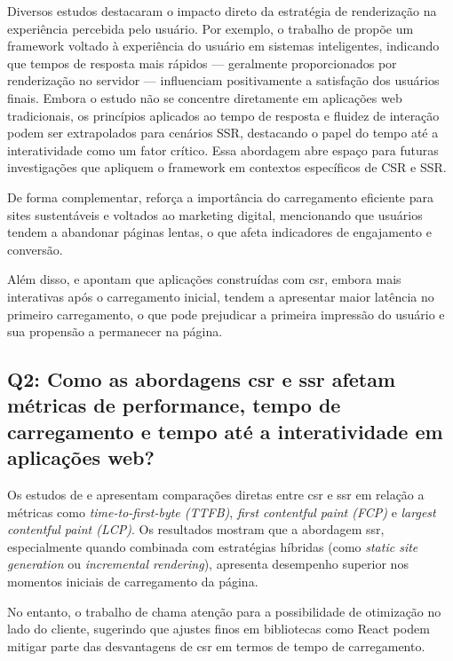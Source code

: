 Diversos estudos destacaram o impacto direto da estratégia de renderização na experiência percebida pelo usuário. Por exemplo, o trabalho de \cite{Zhou2022} propõe um framework voltado à experiência do usuário em sistemas inteligentes, indicando que tempos de resposta mais rápidos — geralmente proporcionados por renderização no servidor — influenciam positivamente a satisfação dos usuários finais. Embora o estudo não se concentre diretamente em aplicações web tradicionais, os princípios aplicados ao tempo de resposta e fluidez de interação podem ser extrapolados para cenários SSR, destacando o papel do tempo até a interatividade como um fator crítico. Essa abordagem abre espaço para futuras investigações que apliquem o framework em contextos específicos de CSR e SSR.

De forma complementar, \cite{Lacom2022} reforça a importância do carregamento eficiente para sites sustentáveis e voltados ao marketing digital, mencionando que usuários tendem a abandonar páginas lentas, o que afeta indicadores de engajamento e conversão.

Além disso, \cite{Pokhriyal2024338} e \cite{Keshari20231571} apontam que aplicações construídas com \acrshort{csr}, embora mais interativas após o carregamento inicial, tendem a apresentar maior latência no primeiro carregamento, o que pode prejudicar a primeira impressão do usuário e sua propensão a permanecer na página.

\subsection{Q2: Como as abordagens \acrshort{csr} e \acrshort{ssr} afetam métricas de performance, tempo de carregamento e tempo até a interatividade em aplicações web?}

Os estudos de \cite{FadhilahIskandar2020} e \cite{Angkasa2023} apresentam comparações diretas entre \acrshort{csr} e \acrshort{ssr} em relação a métricas como \textit{time-to-first-byte (TTFB)}, \textit{first contentful paint (FCP)} e \textit{largest contentful paint (LCP)}. Os resultados mostram que a abordagem \acrshort{ssr}, especialmente quando combinada com estratégias híbridas (como \textit{static site generation} ou \textit{incremental rendering}), apresenta desempenho superior nos momentos iniciais de carregamento da página.

No entanto, o trabalho de \cite{Pavic20211753} chama atenção para a possibilidade de otimização no lado do cliente, sugerindo que ajustes finos em bibliotecas como React podem mitigar parte das desvantagens de \acrshort{csr} em termos de tempo de carregamento.

